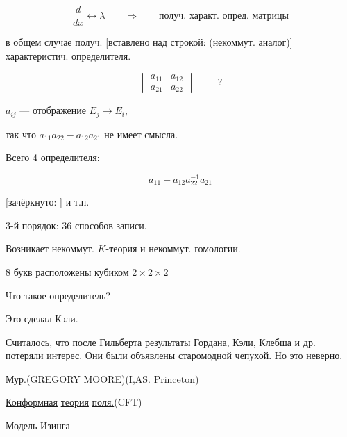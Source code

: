 $$
\frac{d}{dx}\longleftrightarrow\lambda
\qquad\Longrightarrow\qquad\text{получ. характ. опред. матрицы}
$$

в общем случае получ. [вставлено над строкой: (некоммут. аналог)]
характеристич. определителя.

$$
\begin{vmatrix}
a_{11}&a_{12}\\
a_{21}&a_{22}
\end{vmatrix}
\quad\text{— ?}
$$

$a_{ij}$ — отображение $E_j\to E_i$,

так что $a_{11}a_{22}-a_{12}a_{21}$ не имеет смысла.

Всего 4 определителя:

\begin{equation*}
a_{11}-a_{12}a_{22}^{-1}a_{21}
\tag{3}
\end{equation*}

[зачёркнуто: ]
и т.п.



3-й порядок: 36 способов записи.

Возникает некоммут. $K$-теория и некоммут. гомологии.

8 букв расположены кубиком $2\times2\times2$

Что такое определитель?

Это сделал Кэли.

Считалось, что после Гильберта результаты Гордана, Кэли, Клебша и др.
потеряли интерес. Они были объявлены старомодной чепухой. Но это
неверно.

\underline{\underline{Мур.}}\quad (\underline{GREGORY MOORE})\quad (\underline{I,AS. Princeton})

\underline{Конформная} \underline{теория} \underline{поля.}\quad (CFT)

Модель Изинга

\begin{center}
\end{center}


